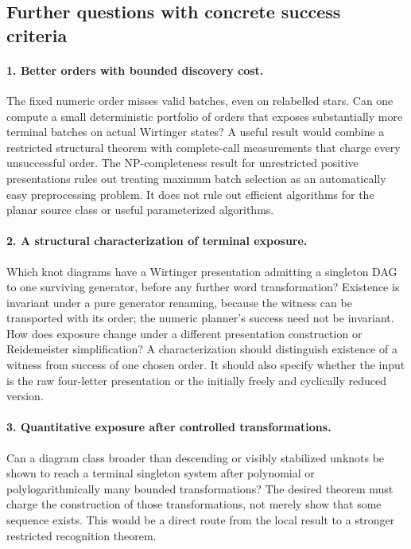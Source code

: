 \subsection{Further questions with concrete success criteria}

\paragraph{1. Better orders with bounded discovery cost.}
The fixed numeric order misses valid batches, even on relabelled stars.
Can one compute a small deterministic portfolio of orders that exposes
substantially more terminal batches on actual Wirtinger states? A useful
result would combine a restricted structural theorem with complete-call
measurements that charge every unsuccessful order. The NP-completeness
result for unrestricted positive presentations rules out treating maximum
batch selection as an automatically easy preprocessing problem. It does
not rule out efficient algorithms for the planar source class or useful
parameterized algorithms.

\paragraph{2. A structural characterization of terminal exposure.}
Which knot diagrams have a Wirtinger presentation admitting a singleton
DAG to one surviving generator, before any further word transformation?
Existence is invariant under a pure generator renaming, because the witness
can be transported with its order; the numeric planner's success need not
be invariant. How does exposure change under a different presentation
construction or Reidemeister simplification? A characterization should
distinguish existence of a witness from success of one chosen order. It should
also specify whether the input is the raw four-letter presentation or
the initially freely and cyclically reduced version.

\paragraph{3. Quantitative exposure after controlled transformations.}
Can a diagram class broader than descending or visibly stabilized unknots
be shown to reach a terminal singleton system after polynomial or
polylogarithmically many bounded transformations? The desired theorem
must charge the construction of those transformations, not merely show
that some sequence exists. This would be a direct route from the local
result to a stronger restricted recognition theorem.

